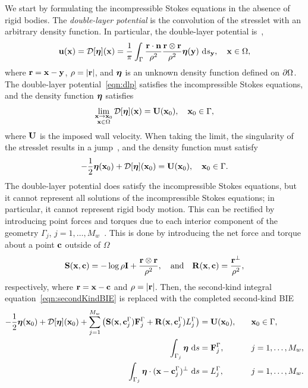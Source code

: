 \documentclass[preprint, 10pt]{elsarticle}
\begin{document}
We start by formulating the incompressible Stokes equations in the
absence of rigid bodies.  The {\em double-layer potential} is the
convolution of the stresslet with an arbitrary density function.  In
particular, the double-layer potential is~\cite{Ladyzhenskaya1963,
Pozrikidis1992},
\begin{align}
  \label{eqn:dlp}
  {\mathbf{u}}({\mathbf{x}}) = {\mathcal{D}}[{\boldsymbol\eta}]({\mathbf{x}}) = \frac{1}{\pi}\int_{\Gamma}
  \frac{{\mathbf{r}}\cdot\mathbf{n}}{\rho^2}\frac{{\mathbf{r}} \otimes {\mathbf{r}}}{\rho^2}
  {\boldsymbol\eta}({\mathbf{y}})~\text{d}s_{{\mathbf{y}}}, \quad {\mathbf{x}} \in \Omega,
\end{align}
where ${\mathbf{r}} = {\mathbf{x}} - {\mathbf{y}}$, $\rho=|{\mathbf{r}}|$, and ${\boldsymbol\eta}$ is an unknown density
function defined on ${\partial}\Omega$.  The double-layer
potential~\eqref{eqn:dlp} satisfies the incompressible Stokes equations,
and the density function ${\boldsymbol\eta}$ satisfies
\begin{align*}
  \lim_{\substack{{\mathbf{x}} \rightarrow {\mathbf{x}}_0 \\ {\mathbf{x}} \in \Omega}}
    {\mathcal{D}}[{\boldsymbol\eta}]({\mathbf{x}}) = {\mathbf{U}}({\mathbf{x}}_0), \quad {\mathbf{x}}_0 \in \Gamma,
\end{align*}
where ${\mathbf{U}}$ is the imposed wall velocity.  When taking the limit, the
singularity of the stresslet results in a jump~\cite{Pozrikidis1992},
and the density function must satisfy  
\begin{align}
  -\frac{1}{2} {\boldsymbol\eta}({\mathbf{x}}_0) + {\mathcal{D}}[{\boldsymbol\eta}]({\mathbf{x}}_0) = {\mathbf{U}}({\mathbf{x}}_0), 
    \quad {\mathbf{x}}_0 \in \Gamma.
  \label{eqn:secondKindBIE}
\end{align}
The double-layer potential does satisfy the incompressible Stokes
equations, but it cannot represent all solutions of the incompressible
Stokes equations; in particular, it cannot represent rigid body motion.
This can be rectified by introducing point forces and torques due to
each interior component of the geometry $\Gamma_j$, $j =
1,\ldots,M_w$~\cite{Power1987, Power1993}.  This is done by introducing
the net force and torque about a point ${\mathbf{c}}$ outside of $\Omega$
\begin{align*}
  \mathbf{S}({\mathbf{x}},{\mathbf{c}}) = -\log\rho\mathbf{I} + 
  \frac{{\mathbf{r}} \otimes {\mathbf{r}}}{\rho^2}, \quad \text{and} \quad
  \mathbf{R}({\mathbf{x}},{\mathbf{c}}) = \frac{{\mathbf{r}}^\perp}{\rho^2},
\end{align*}
respectively, where ${\mathbf{r}} = {\mathbf{x}} - {\mathbf{c}}$ and $\rho = |{\mathbf{r}}|$.  Then, the
second-kind integral equation~\eqref{eqn:secondKindBIE} is replaced with
the completed second-kind BIE
\begin{equation}
  \label{eq:completed_DLP}
  \begin{split}
  -\frac{1}{2}{\boldsymbol\eta}({\mathbf{x}}_0) + {\mathcal{D}}[{\boldsymbol\eta}]({\mathbf{x}}_0) + 
    \sum_{j=1}^{M_w} \left(\mathbf{S}({\mathbf{x}},{\mathbf{c}}^\Gamma_j){\mathbf{F}}^\Gamma_j + 
      \mathbf{R}({\mathbf{x}},{\mathbf{c}}^\Gamma_j)L^\Gamma_j\right) &= {\mathbf{U}}({\mathbf{x}}_0),
      \quad &&{\mathbf{x}}_0 \in \Gamma, \\
  \int_{\Gamma_j} {\boldsymbol\eta}~\text{d}s &= {\mathbf{F}}^\Gamma_j, 
      &&j=1,\ldots,M_w, \\
  \int_{\Gamma_j} {\boldsymbol\eta}\cdot ({\mathbf{x}} - {\mathbf{c}}^\Gamma_j)^\perp~\text{d}s &=   
      L^\Gamma_j, &&j=1,\ldots,M_w.
  \end{split}
\end{equation}
\end{document}

